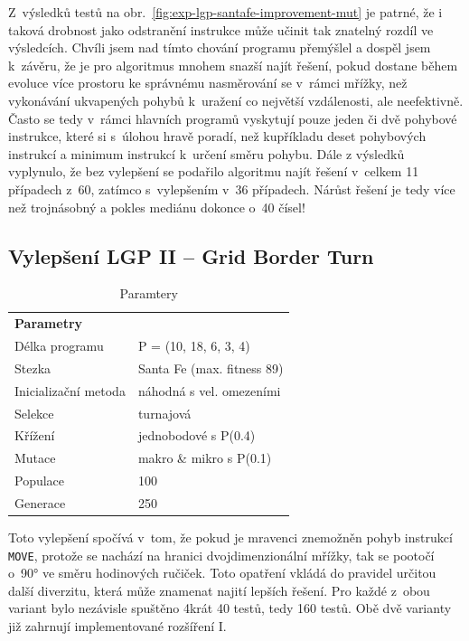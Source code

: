 Z~výsledků testů na obr.~\ref{fig:exp-lgp-santafe-improvement-mut} je patrné, že i taková drobnost jako odstranění instrukce může učinit tak znatelný rozdíl ve výsledcích. 
Chvíli jsem nad tímto chování programu přemýšlel a dospěl jsem k~závěru, že je pro algoritmus mnohem snazší najít řešení, pokud dostane během evoluce více prostoru ke správnému nasměrování se v~rámci mřížky, než vykonávání ukvapených pohybů k~uražení co největší vzdálenosti, ale neefektivně. Často se tedy v~rámci hlavních programů vyskytují pouze jeden či dvě pohybové instrukce, které si s~úlohou hravě poradí, než kupříkladu deset pohybových instrukcí a minimum instrukcí k~určení směru pohybu. Dále z výsledků vyplynulo, že bez vylepšení se podařilo algoritmu najít řešení v~celkem 11 případech z~60, zatímco s~vylepšením v~36 případech. Nárůst řešení je tedy více než trojnásobný a pokles mediánu dokonce o~40 čísel!

\subsection{Vylepšení LGP II -- Grid Border Turn} 
\begin{table}[!h]
\centering
\begin{tabular}{ll}
\hline
\textbf{Parametry}   &             \\
Délka programu       & P = (10, 18, 6, 3, 4)  \\
Stezka               & Santa Fe (max. fitness 89) \\
Inicializační metoda & náhodná s vel. omezeními \\
Selekce              & turnajová  \\
Křížení              & jednobodové s P(0.4) \\
Mutace               & makro \& mikro s P(0.1)\\ 
Populace             & 100 \\ 
Generace             & 250 \\ \hline
\end{tabular}
    \caption{Paramtery}
\end{table}

Toto vylepšení spočívá v~tom, že pokud je mravenci znemožněn pohyb instrukcí \texttt{MOVE}, protože se nachází na hranici dvojdimenzionální mřížky, tak se pootočí o~90° ve směru hodinových ručiček. Toto opatření vkládá do pravidel určitou další diverzitu, která může znamenat najití lepších řešení. Pro každé z~obou variant bylo nezávisle spuštěno 4krát 40 testů, tedy 160 testů. Obě dvě varianty již zahrnují implementované rozšíření I.

